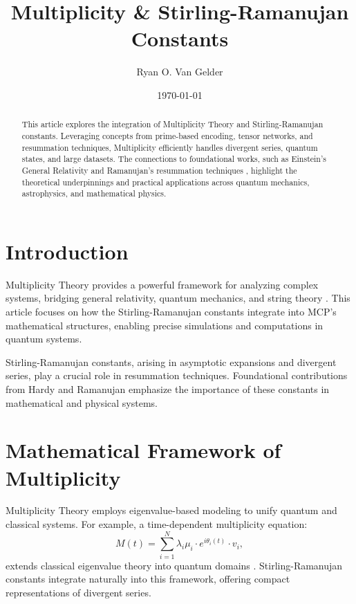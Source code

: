 \documentclass{article}
\theoremstyle{plain}
\begin{document}
\title{Multiplicity \& Stirling-Ramanujan Constants}

\author{Ryan O. Van Gelder}
\date{\today}

\maketitle

\begin{abstract}
This article explores the integration of Multiplicity Theory and Stirling-Ramanujan constants. Leveraging concepts from prime-based encoding, tensor networks, and resummation techniques, Multiplicity efficiently handles divergent series, quantum states, and large datasets. The connections to foundational works, such as Einstein's General Relativity \cite{Einstein1916} and Ramanujan's resummation techniques \cite{Ramanujan1957}, highlight the theoretical underpinnings and practical applications across quantum mechanics, astrophysics, and mathematical physics.
\end{abstract}

\section{Introduction}
Multiplicity Theory provides a powerful framework for analyzing complex systems, bridging general relativity, quantum mechanics, and string theory \cite{Witten1995, Green1987}. This article focuses on how the Stirling-Ramanujan constants integrate into MCP’s mathematical structures, enabling precise simulations and computations in quantum systems.

Stirling-Ramanujan constants, arising in asymptotic expansions and divergent series, play a crucial role in resummation techniques. Foundational contributions from Hardy \cite{Hardy1949} and Ramanujan \cite{Ramanujan1957} emphasize the importance of these constants in mathematical and physical systems.

\section{Mathematical Framework of Multiplicity}
Multiplicity Theory employs eigenvalue-based modeling to unify quantum and classical systems. For example, a time-dependent multiplicity equation:
\begin{equation}
M(t) = \sum_{i=1}^N \lambda_i \mu_i \cdot e^{i \theta_i(t)} \cdot v_i,
\end{equation}
extends classical eigenvalue theory into quantum domains \cite{Schrodinger1926, Maldacena1999}. Stirling-Ramanujan constants integrate naturally into this framework, offering compact representations of divergent series.
\end{document}
